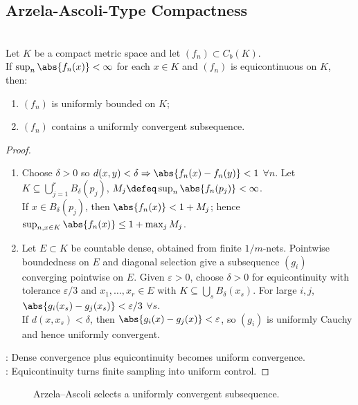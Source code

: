 \subsection{Arzela-Ascoli-Type Compactness}

\begin{theorem} \label{thm:arzela-ascoli-compact-metric} \\
Let $K$ be a compact metric space and let $(f_n)\subset C_b(K)$.\\
If $\sup_n\abs{f_n(x)}<\infty$ for each $x\in K$ and $(f_n)$ is equicontinuous on $K$, then:
\begin{enumerate}[label=(\roman*)]
\setlength{\itemsep}{0pt}
\item $(f_n)$ is uniformly bounded on $K$;
\item $(f_n)$ contains a uniformly convergent subsequence.
\end{enumerate}
\begin{proof}
\begin{enumerate}[label=(\roman*)]
\setlength{\itemsep}{0pt}
\item Choose $\delta>0$ so $d(x,y)<\delta\Rightarrow\abs{f_n(x)-f_n(y)}<1$ $\forall n$. Let $K\subseteq\bigcup_{j=1}^{r}B_{\delta}(p_j)$, $M_j\defeq\sup_n\abs{f_n(p_j)}<\infty$.\\
If $x\in B_{\delta}(p_j)$, then $\abs{f_n(x)}<1+M_j$; hence $\sup_{n,x\in K}\abs{f_n(x)}\leq1+\max_jM_j$.
\item Let $E\subset K$ be countable dense, obtained from finite $1/m$-nets. Pointwise boundedness on $E$ and diagonal selection give a subsequence $(g_i)$ converging pointwise on $E$. Given $\varepsilon>0$, choose $\delta>0$ for equicontinuity with tolerance $\varepsilon/3$ and $x_1,\ldots,x_r\in E$ with $K\subseteq\bigcup_sB_{\delta}(x_s)$. For large $i,j$, $\abs{g_i(x_s)-g_j(x_s)}<\varepsilon/3$ $\forall s$.\\
If $d(x,x_s)<\delta$, then $\abs{g_i(x)-g_j(x)}<\varepsilon$, so $(g_i)$ is uniformly Cauchy and hence uniformly convergent.
\end{enumerate}
: Dense convergence plus equicontinuity becomes uniform convergence.\\
: Equicontinuity turns finite sampling into uniform control.
\end{proof}
\end{theorem}

\begin{figure}[H]
  \centering
  
  \caption{Arzela--Ascoli selects a uniformly convergent subsequence.}
  \label{fig:sequential-compactness-subsequence}
\end{figure}


